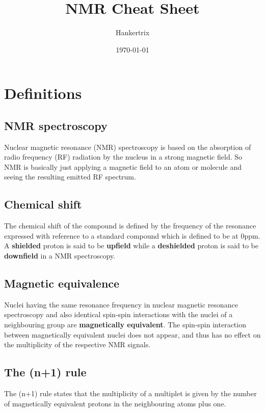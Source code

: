 \documentclass[11pt]{article}
\author{Hankertrix}
\date{\today}
\title{NMR Cheat Sheet}
\begin{document}
\maketitle
\setcounter{tocdepth}{2}
\tableofcontents

\newpage

\section{Definitions}
\label{sec:org94118d5}

\subsection{NMR spectroscopy}
\label{sec:orgf2ac858}
Nuclear magnetic resonance (NMR) spectroscopy is based on the absorption of radio frequency (RF) radiation by the nucleus in a strong magnetic field. So NMR is basically just applying a magnetic field to an atom or molecule and seeing the resulting emitted RF spectrum.

\subsection{Chemical shift}
\label{sec:orgfb086f2}
The chemical shift of the compound is defined by the frequency of the resonance expressed with reference to a standard compound which is defined to be at 0ppm. A \textbf{shielded} proton is said to be \textbf{upfield} while a \textbf{deshielded} proton is said to be \textbf{downfield} in a NMR spectroscopy.

\subsection{Magnetic equivalence}
\label{sec:orgee57331}
Nuclei having the same resonance frequency in nuclear magnetic resonance spectroscopy and also identical spin-spin interactions with the nuclei of a neighbouring group are \textbf{magnetically equivalent}. The spin-spin interaction between magnetically equivalent nuclei does not appear, and thus has no effect on the multiplicity of the respective NMR signals.

\subsection{The (n+1) rule}
\label{sec:org4c3858e}
The (n+1) rule states that the multiplicity of a multiplet is given by the number of magnetically equivalent protons in the neighbouring atoms plus one.
\end{document}
